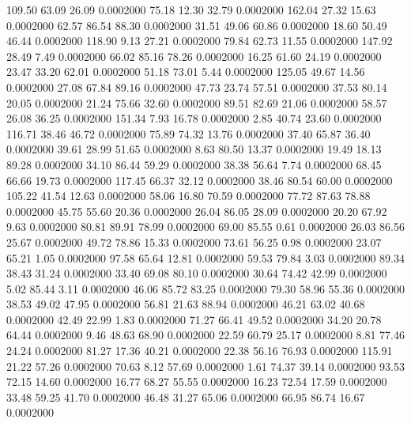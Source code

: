  109.50   63.09   26.09   0.0002000
  75.18   12.30   32.79   0.0002000
 162.04   27.32   15.63   0.0002000
  62.57   86.54   88.30   0.0002000
  31.51   49.06   60.86   0.0002000
  18.60   50.49   46.44   0.0002000
 118.90    9.13   27.21   0.0002000
  79.84   62.73   11.55   0.0002000
 147.92   28.49    7.49   0.0002000
  66.02   85.16   78.26   0.0002000
  16.25   61.60   24.19   0.0002000
  23.47   33.20   62.01   0.0002000
  51.18   73.01    5.44   0.0002000
 125.05   49.67   14.56   0.0002000
  27.08   67.84   89.16   0.0002000
  47.73   23.74   57.51   0.0002000
  37.53   80.14   20.05   0.0002000
  21.24   75.66   32.60   0.0002000
  89.51   82.69   21.06   0.0002000
  58.57   26.08   36.25   0.0002000
 151.34    7.93   16.78   0.0002000
   2.85   40.74   23.60   0.0002000
 116.71   38.46   46.72   0.0002000
  75.89   74.32   13.76   0.0002000
  37.40   65.87   36.40   0.0002000
  39.61   28.99   51.65   0.0002000
   8.63   80.50   13.37   0.0002000
  19.49   18.13   89.28   0.0002000
  34.10   86.44   59.29   0.0002000
  38.38   56.64    7.74   0.0002000
  68.45   66.66   19.73   0.0002000
 117.45   66.37   32.12   0.0002000
  38.46   80.54   60.00   0.0002000
 105.22   41.54   12.63   0.0002000
  58.06   16.80   70.59   0.0002000
  77.72   87.63   78.88   0.0002000
  45.75   55.60   20.36   0.0002000
  26.04   86.05   28.09   0.0002000
  20.20   67.92    9.63   0.0002000
  80.81   89.91   78.99   0.0002000
  69.00   85.55    0.61   0.0002000
  26.03   86.56   25.67   0.0002000
  49.72   78.86   15.33   0.0002000
  73.61   56.25    0.98   0.0002000
  23.07   65.21    1.05   0.0002000
  97.58   65.64   12.81   0.0002000
  59.53   79.84    3.03   0.0002000
  89.34   38.43   31.24   0.0002000
  33.40   69.08   80.10   0.0002000
  30.64   74.42   42.99   0.0002000
   5.02   85.44    3.11   0.0002000
  46.06   85.72   83.25   0.0002000
  79.30   58.96   55.36   0.0002000
  38.53   49.02   47.95   0.0002000
  56.81   21.63   88.94   0.0002000
  46.21   63.02   40.68   0.0002000
  42.49   22.99    1.83   0.0002000
  71.27   66.41   49.52   0.0002000
  34.20   20.78   64.44   0.0002000
   9.46   48.63   68.90   0.0002000
  22.59   60.79   25.17   0.0002000
   8.81   77.46   24.24   0.0002000
  81.27   17.36   40.21   0.0002000
  22.38   56.16   76.93   0.0002000
 115.91   21.22   57.26   0.0002000
  70.63    8.12   57.69   0.0002000
   1.61   74.37   39.14   0.0002000
  93.53   72.15   14.60   0.0002000
  16.77   68.27   55.55   0.0002000
  16.23   72.54   17.59   0.0002000
  33.48   59.25   41.70   0.0002000
  46.48   31.27   65.06   0.0002000
  66.95   86.74   16.67   0.0002000
